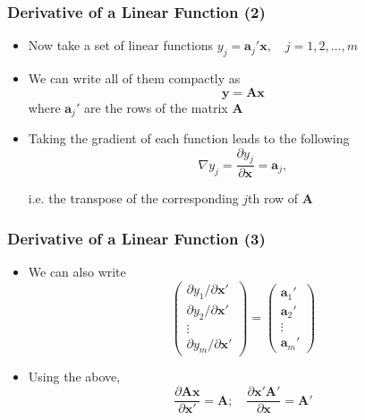 \documentclass[10pt]{beamer}
\theoremstyle{definition}
\begin{document}
\begin{frame}[fragile]
	\frametitle{Derivative of a Linear Function (2)}
	\begin{itemize}
		\item Now take a set of linear functions $ y_{j} = \mathbf{a}_{j}'\mathbf{x}, \quad j = 1,2,\ldots, m$
		
		\item We can write all of them compactly as
		\[
			\mathbf{y = Ax}
		\]
		where $ \mathbf{a}_{j}' $ are the rows of the matrix $ \mathbf{A} $
		
		\item Taking the gradient of each function leads to the following
		\[
			\nabla y_{j} = \dfrac{\partial y_{j}}{\partial \mathbf{x}} = \mathbf{a}_{j},
		\]
		
		i.e. the transpose of the corresponding $ j $th row of $ \mathbf{A} $
	\end{itemize}
\end{frame}

\begin{frame}[fragile]
	\frametitle{Derivative of a Linear Function (3)}
	\begin{itemize}
		\item We can also write
		\[
			\left(
			\begin{array}{c}
				\partial y_{1}/\partial \mathbf{x}'\\
				\partial y_{2}/\partial \mathbf{x}'\\
				\vdots\\
				\partial y_{m}/\partial \mathbf{x}'
			\end{array}
			\right) = 
			\left(
			\begin{array}{c}
				\mathbf{a}_{1}'\\
				\mathbf{a}_{2}'\\
				\vdots\\
				\mathbf{a}_{m}'
			\end{array}
			\right)
		\]
		
		\item Using the above,
		\[
			\dfrac{\partial \mathbf{Ax}}{\partial\mathbf{x}'} = \mathbf{A}; \quad \dfrac{\partial \mathbf{x'A'}}{\partial\mathbf{x}} = \mathbf{A'}
		\]
	\end{itemize}
\end{frame}
\end{document}
